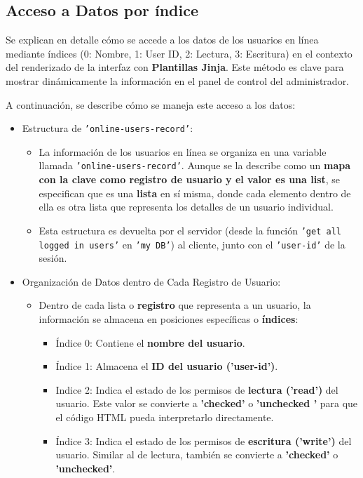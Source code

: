 \documentclass{report}
\begin{document}
\subsection{Acceso a Datos por índice}
Se explican en detalle cómo se accede a los datos de los usuarios en línea mediante índices (0: Nombre, 1: User ID, 2: Lectura, 3: Escritura) 
en el contexto del renderizado de la interfaz con \textbf{Plantillas Jinja}. Este método es clave para mostrar dinámicamente la información en el panel 
de control del administrador.

A continuación, se describe cómo se maneja este acceso a los datos:
\begin{itemize}
    \item Estructura de \texttt{'online-users-record'}:
    \begin{itemize}
        \item La información de los usuarios en línea se organiza en una variable llamada \texttt{'online-users-record'}. Aunque se la describe como 
        un \textbf{mapa con la clave como registro de usuario y el valor es una list}, se  especifican que es una \textbf{lista} en sí misma, 
        donde cada elemento dentro de ella es otra lista que representa los detalles de un usuario individual.
        \item Esta estructura es devuelta por el servidor (desde la función \texttt{'get all logged in users'} en \texttt{'my DB'}) al cliente, 
        junto con el \texttt{'user-id'} de la sesión.
    \end{itemize}

    \item Organización de Datos dentro de Cada Registro de Usuario:
    \begin{itemize}
        \item Dentro de cada lista o \textbf{registro} que representa a un usuario, la información se almacena en posiciones 
        específicas o \textbf{índices}:
            \begin{itemize}
                \item Índice 0: Contiene el \textbf{nombre del usuario}.
                \item Índice 1: Almacena el \textbf{ID del usuario ('user-id')}.
                \item Indice 2: Indica el estado de los permisos de \textbf{lectura ('read')} del usuario. Este valor se convierte a 
                \textbf{'checked'} o \textbf{ 'unchecked '} para que el código HTML pueda interpretarlo directamente.
                \item Índice 3: Indica el estado de los permisos de \textbf{escritura ('write')} del usuario. Similar al de lectura, 
                también se convierte a \textbf{'checked'} o \textbf{'unchecked'}.        
        \end{itemize}    
    \end{itemize}


\end{itemize}
\end{document}
